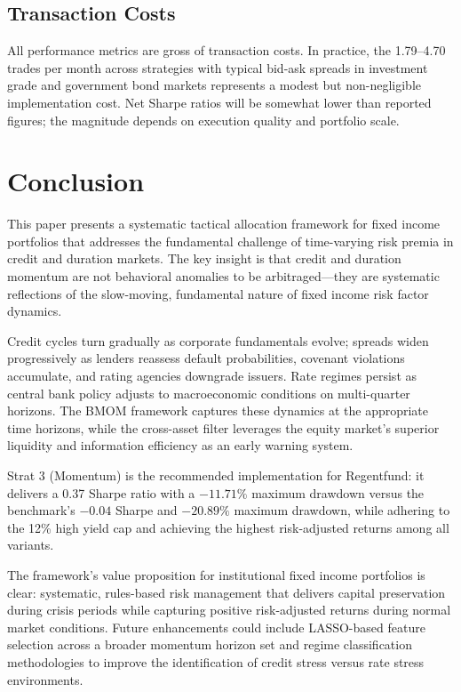 \documentclass[11pt]{article}
\begin{document}
\subsection{Transaction Costs}

All performance metrics are gross of transaction costs. In practice, the 1.79--4.70 trades per month across strategies with typical bid-ask spreads in investment grade and government bond markets represents a modest but non-negligible implementation cost. Net Sharpe ratios will be somewhat lower than reported figures; the magnitude depends on execution quality and portfolio scale.

\section{Conclusion}

This paper presents a systematic tactical allocation framework for fixed income portfolios that addresses the fundamental challenge of time-varying risk premia in credit and duration markets. The key insight is that credit and duration momentum are not behavioral anomalies to be arbitraged---they are systematic reflections of the slow-moving, fundamental nature of fixed income risk factor dynamics.

Credit cycles turn gradually as corporate fundamentals evolve; spreads widen progressively as lenders reassess default probabilities, covenant violations accumulate, and rating agencies downgrade issuers. Rate regimes persist as central bank policy adjusts to macroeconomic conditions on multi-quarter horizons. The BMOM framework captures these dynamics at the appropriate time horizons, while the cross-asset filter leverages the equity market's superior liquidity and information efficiency as an early warning system.

Strat 3 (Momentum) is the recommended implementation for Regentfund: it delivers a 0.37 Sharpe ratio with a $-11.71\%$ maximum drawdown versus the benchmark's $-0.04$ Sharpe and $-20.89\%$ maximum drawdown, while adhering to the 12\% high yield cap and achieving the highest risk-adjusted returns among all variants.

The framework's value proposition for institutional fixed income portfolios is clear: systematic, rules-based risk management that delivers capital preservation during crisis periods while capturing positive risk-adjusted returns during normal market conditions. Future enhancements could include LASSO-based feature selection across a broader momentum horizon set and regime classification methodologies to improve the identification of credit stress versus rate stress environments.

\end{document}
